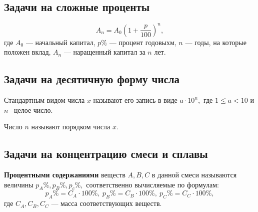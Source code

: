 \documentclass[a4paper, 12pt]{article}
\begin{document}
\subsection{Задачи на сложные проценты}
$$A_n=A_0\left( 1+\frac{p}{100}\right)^n ,$$
где $A_0$ --- начальный капитал, $p\%$ --- процент годовыхм, $n$ --- годы, на которые положен вклад, $A_n$ --- наращенный капитал за $n$ лет. 
\subsection{Задачи на десятичную форму числа}
Стандартным видом числа $x$ называют его запись в виде $a\cdot 10^n,$ где $1\le a < 10$ и $n$ --целое число.

Число $n$ называют порядком числа $x.$ 

\subsection{Задачи на концентрацию смеси и сплавы}
\textbf{Процентными содержаниями} веществ $A, B, C$ в данной смеси называются величины $p_A\%, p_B\%, p_c\%,$ соответственно вычисляемые по формулам:
$$
p_A\%=C_A\cdot 100\%,\  p_B\%=C_B\cdot 100\%,\ p_C\%=C_C\cdot 100\%,
$$
где $C_A, C_B, C_C$ --- масса соответствующих веществ.
\end{document}
